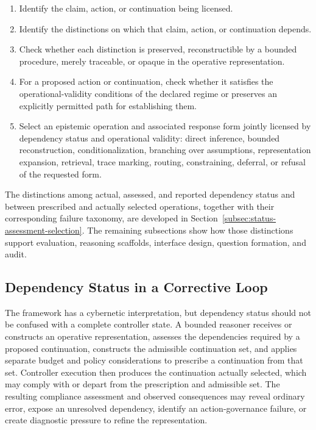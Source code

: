\documentclass[11pt]{article}
\theoremstyle{definition}
\theoremstyle{remark}
\begin{document}
\begin{enumerate}
    \item Identify the claim, action, or continuation being licensed.
    \item Identify the distinctions on which that claim, action, or continuation depends.
    \item Check whether each distinction is preserved, reconstructible by a bounded procedure, merely traceable, or opaque in the operative representation.
    \item For a proposed action or continuation, check whether it satisfies the operational-validity conditions of the declared regime or preserves an explicitly permitted path for establishing them.
    \item Select an epistemic operation and associated response form jointly licensed by dependency status and operational validity: direct inference, bounded reconstruction, conditionalization, branching over assumptions, representation expansion, retrieval, trace marking, routing, constraining, deferral, or refusal of the requested form.
\end{enumerate}

The distinctions among actual, assessed, and reported dependency status and between prescribed and actually selected operations, together with their corresponding failure taxonomy, are developed in Section~\ref{subsec:status-assessment-selection}. The remaining subsections show how those distinctions support evaluation, reasoning scaffolds, interface design, question formation, and audit.

\subsection{Dependency Status in a Corrective Loop}

The framework has a cybernetic interpretation, but dependency status should not be confused with a complete controller state. A bounded reasoner receives or constructs an operative representation, assesses the dependencies required by a proposed continuation, constructs the admissible continuation set, and applies separate budget and policy considerations to prescribe a continuation from that set. Controller execution then produces the continuation actually selected, which may comply with or depart from the prescription and admissible set. The resulting compliance assessment and observed consequences may reveal ordinary error, expose an unresolved dependency, identify an action-governance failure, or create diagnostic pressure to refine the representation.
\end{document}
